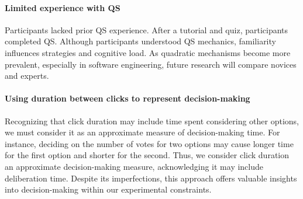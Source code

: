 \paragraph{Limited experience with QS}
Participants lacked prior QS experience. After a tutorial and quiz, participants completed QS. Although participants understood QS mechanics, familiarity influences strategies and cognitive load. As quadratic mechanisms become more prevalent, especially in software engineering, future research will compare novices and experts.

\paragraph{Using duration between clicks to represent decision-making}
Recognizing that click duration may include time spent considering other options, we must consider it as an approximate measure of decision-making time. For instance, deciding on the number of votes for two options may cause longer time for the first option and shorter for the second. Thus, we consider click duration an approximate decision-making measure, acknowledging it may include deliberation time. Despite its imperfections, this approach offers valuable insights into decision-making within our experimental constraints.




